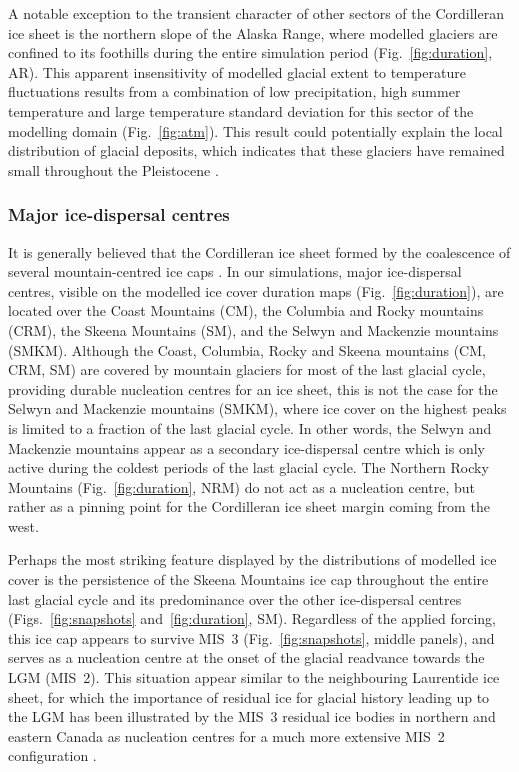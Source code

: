 \documentclass[tc]{copernicus}
\begin{document}
A notable exception to the transient character of other sectors of the
Cordilleran ice sheet
is the northern slope of the Alaska Range, where modelled glaciers are confined
to its foothills during the entire simulation period (Fig.~\ref{fig:duration},
AR). This apparent insensitivity of modelled glacial extent to temperature
fluctuations results from a combination of low precipitation, high summer
temperature and large temperature standard deviation for this sector of the
modelling domain (Fig.~\ref{fig:atm}). This result could potentially explain
the local distribution of glacial deposits, which indicates that these glaciers
have remained small throughout the Pleistocene \citep{Kaufman.Manley.2004}.

\subsubsection{Major ice-dispersal centres}

It is generally believed that the Cordilleran ice sheet formed by the
coalescence of several mountain-centred ice caps \citep{Davis.Mathews.1944}.
In our simulations, major ice-dispersal centres, visible on the modelled ice
cover duration maps (Fig.~\ref{fig:duration}), are located over the Coast
Mountains (CM), the Columbia and Rocky mountains (CRM), the Skeena Mountains
(SM), and the Selwyn and Mackenzie mountains (SMKM). Although the Coast,
Columbia, Rocky and Skeena mountains (CM, CRM, SM) are covered by mountain
glaciers for most of the last glacial cycle, providing durable nucleation
centres for an ice sheet, this is not the case for the Selwyn and
Mackenzie mountains (SMKM), where ice cover on the highest peaks is limited to a
fraction of the last glacial cycle. In other words, the Selwyn and Mackenzie
mountains appear as a secondary ice-dispersal centre which is only active
during the coldest periods of the last glacial cycle. The Northern Rocky
Mountains (Fig.~\ref{fig:duration}, NRM) do not act as a nucleation centre,
but rather as a pinning point for the Cordilleran ice sheet margin coming from
the west.

Perhaps the most striking feature displayed by the distributions of modelled
ice cover is the persistence of the Skeena Mountains ice cap throughout the
entire last glacial cycle and its predominance over the other ice-dispersal
centres
(Figs.~\ref{fig:snapshots} and~\ref{fig:duration}, SM). Regardless of the applied
forcing, this ice cap appears to survive MIS~3 (Fig.~\ref{fig:snapshots},
middle panels), and serves as a nucleation centre at the onset of the glacial
readvance towards the LGM (MIS~2). This situation appear similar to the neighbouring Laurentide ice sheet, for which the importance of residual ice for
glacial history leading up to the LGM has been illustrated by the
MIS~3 residual ice bodies in northern and eastern Canada as nucleation centres
for a much more extensive MIS~2 configuration \citep{Kleman.etal.2010}.
\end{document}
